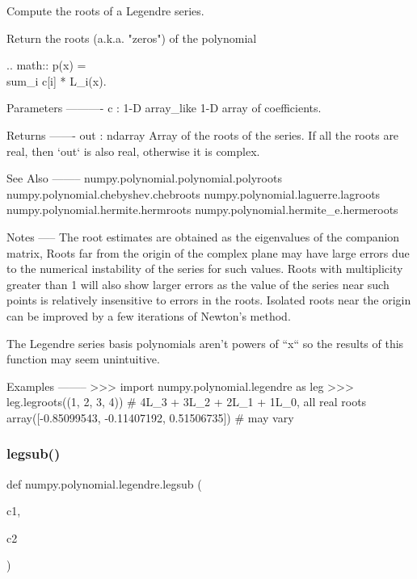 \begin{DoxyVerb}Compute the roots of a Legendre series.

Return the roots (a.k.a. "zeros") of the polynomial

.. math:: p(x) = \\sum_i c[i] * L_i(x).

Parameters
----------
c : 1-D array_like
    1-D array of coefficients.

Returns
-------
out : ndarray
    Array of the roots of the series. If all the roots are real,
    then `out` is also real, otherwise it is complex.

See Also
--------
numpy.polynomial.polynomial.polyroots
numpy.polynomial.chebyshev.chebroots
numpy.polynomial.laguerre.lagroots
numpy.polynomial.hermite.hermroots
numpy.polynomial.hermite_e.hermeroots

Notes
-----
The root estimates are obtained as the eigenvalues of the companion
matrix, Roots far from the origin of the complex plane may have large
errors due to the numerical instability of the series for such values.
Roots with multiplicity greater than 1 will also show larger errors as
the value of the series near such points is relatively insensitive to
errors in the roots. Isolated roots near the origin can be improved by
a few iterations of Newton's method.

The Legendre series basis polynomials aren't powers of ``x`` so the
results of this function may seem unintuitive.

Examples
--------
>>> import numpy.polynomial.legendre as leg
>>> leg.legroots((1, 2, 3, 4)) # 4L_3 + 3L_2 + 2L_1 + 1L_0, all real roots
array([-0.85099543, -0.11407192,  0.51506735]) # may vary\end{DoxyVerb}
 \mbox{\label{namespacenumpy_1_1polynomial_1_1legendre_af5bfa3c9039d6f2635090f103fc4dc50}} 
\subsubsection{\texorpdfstring{legsub()}{legsub()}}
{\footnotesize\ttfamily def numpy.\+polynomial.\+legendre.\+legsub (\begin{DoxyParamCaption}\item[{}]{c1,  }\item[{}]{c2 }\end{DoxyParamCaption})}

